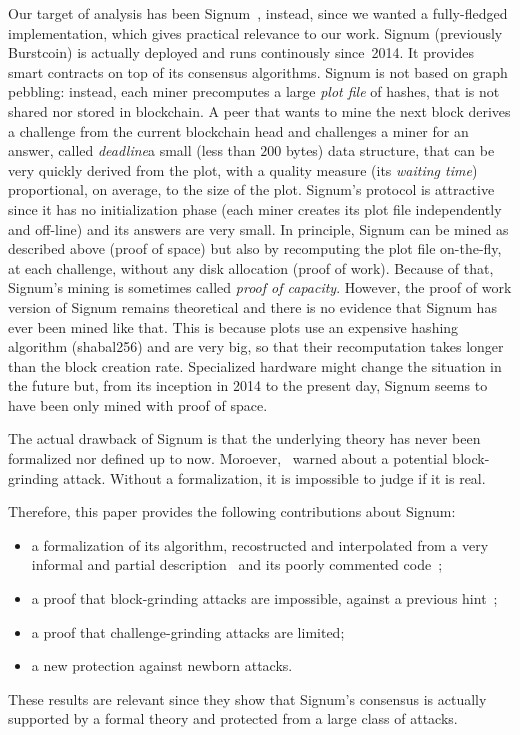 Our target of analysis has been Signum~\cite{Signum}, instead, since we wanted a fully-fledged implementation,
which gives practical relevance to our work. Signum (previously Burstcoin) is
actually deployed and runs continously since~2014. It provides smart contracts on top of its consensus algorithms.
Signum is not based on graph pebbling: instead,
each miner precomputes a large \emph{plot file} of hashes, that is not shared nor
stored in blockchain.
A peer that wants to mine the next block derives a challenge from the current blockchain head
and challenges a miner for an answer, called
\emph{deadline}\ie a small (less than $200$ bytes) data structure, that can be very quickly
derived from the plot, with a quality measure
(its \emph{waiting time}) proportional, on average, to the size of the plot.
Signum's protocol is attractive since it has no initialization phase (each miner creates its plot file
independently and off-line) and its answers are very small.
In principle, Signum can be mined as described above (proof of space)
but also by recomputing the plot file on-the-fly, at each challenge, without any disk allocation
(proof of work). Because of that, Signum's mining is sometimes called \emph{proof of capacity}.
However, the proof of work version of Signum remains theoretical and there is no evidence that Signum has ever
been mined like that. This is because plots use an expensive hashing algorithm (shabal256) and are very big, so that their recomputation takes longer than the block creation rate.
Specialized hardware might change the situation in the future but, from its inception in 2014 to
the present day, Signum seems to have been only mined with proof of space.

The actual drawback of Signum is that the underlying theory has never been formalized nor defined up to now.
Moroever, \cite{ParkKFGAP18}~warned about a potential block-grinding attack.
Without a formalization, it is impossible to judge if it is real.

Therefore, this paper provides the following contributions about Signum:
%
\begin{itemize}
\item a formalization of its algorithm, recostructed and interpolated from a very informal and partial
  description~\cite{SignumPlotting} and its poorly commented code~\cite{SignumSource};
\item a proof that block-grinding attacks are impossible, against a previous hint~\cite{ParkKFGAP18};
\item a proof that challenge-grinding attacks are limited;
\item a new protection against newborn attacks.
\end{itemize}
%
These results are relevant since they show that Signum's consensus
is actually supported by a formal theory and protected from a large class of attacks.

